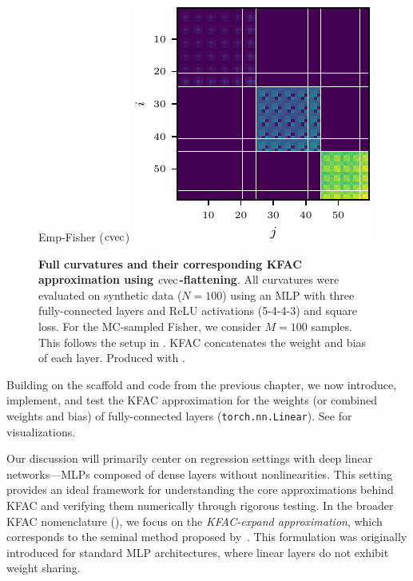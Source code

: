 \begin{figure}[!h]
\begin{minipage}[t]{0.485\linewidth}
  \end{minipage}
  \hfill
  \begin{minipage}[t]{0.485\linewidth}
    \centering
    Emp-Fisher ($\operatorname{cvec}$)\vspace{1ex}
    \includegraphics[width=1.0\linewidth]{../kfs/plots/synthetic_cvec_empfisher_kfac.pdf}
  \end{minipage}
  \caption{\textbf{Full curvatures and their corresponding KFAC approximation using $\operatorname{cvec}$-flattening}.
    All curvatures were evaluated on synthetic data ($N = 100$) using an MLP with three fully-connected layers and ReLU activations (5-4-4-3) and square loss.
    For the MC-sampled Fisher, we consider $M = 100$ samples.
    This follows the setup in .
    KFAC concatenates the weight and bias of each layer.
    Produced with .}
  \label{fig:cvec-kfac-full-comparison}
\end{figure}
\switchcolumn[0]

Building on the scaffold and code from the previous chapter, we now introduce, implement, and test the KFAC approximation for the weights (or combined weights and bias) of fully-connected layers (\texttt{torch.nn.Linear}).
See  for visualizations.

Our discussion will primarily center on regression settings with deep linear networks---MLPs composed of dense layers without nonlinearities.
This setting provides an ideal framework for understanding the core approximations behind KFAC and verifying them numerically through rigorous testing.
In the broader KFAC nomenclature (), we focus on the \emph{KFAC-expand approximation}, which corresponds to the seminal method proposed by~\citet{martens2015optimizing}.
This formulation was originally introduced for standard MLP architectures, where linear layers do not exhibit weight sharing.

